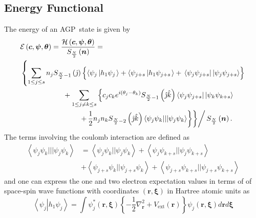 \documentclass[aps,preprint]{revtex4}%
\begin{document}
\subsection{Energy Functional\label{AGPFunc}}

The energy of an AGP\ state is given by
\begin{align}
&  \mathcal{E}\left(  \boldsymbol{c},\boldsymbol{\psi},\boldsymbol{\theta
}\right)  =\frac{\mathcal{H}\left(  \boldsymbol{c},\boldsymbol{\psi
},\boldsymbol{\theta}\right)  }{S_{\frac{N}{2}}\left(  \boldsymbol{n}\right)
}=\nonumber\\
&  \left\{  \sum_{1\leq j\leq s}n_{j}S_{\frac{N}{2}-1}\left(  \hat{\jmath
}\right)  \left\{  \overset{}{\left\langle \psi_{j}\left\vert h_{1}\psi
_{j}\right.  \right\rangle +\left\langle \psi_{j+s}\left\vert h_{1}\psi
_{j+s}\right.  \right\rangle }+\,\left\langle \psi_{j}\psi_{j+s}\right\vert
\left\vert \psi_{j}\psi_{j+s}\right\rangle \right\}  \right. \nonumber\\
&  \qquad\qquad\qquad+\sum_{1\leq j\neq k\leq s}\left\{  c_{j}c_{k}e^{i\left(
\theta_{j}-\theta_{k}\right)  }S_{\frac{N}{2}-1}\left(  \hat{\jmath}\hat
{k}\right)  \left\langle \psi_{j}\psi_{j+s}\right\vert \left\vert \psi_{k}%
\psi_{k+s}\right\rangle \right. \nonumber\\
&  \qquad\qquad\qquad\qquad\left.  \left.  \left.  +\,\frac{1}{2}\overset
{}{n_{j}n_{k}S_{\frac{N}{2}-2}\left(  \hat{\jmath}\hat{k}\right)  \left\langle
\psi_{j}\psi_{k}|||\psi_{j}\psi_{k}\right\rangle }\right\}  \right\}  \right/
S_{\frac{N}{2}}\left(  \boldsymbol{n}\right)  . \label{EnFunc}%
\end{align}
The terms involving the coulomb interaction are defined as
\begin{align}
\left\langle \psi_{j}\psi_{k}|||\psi_{j}\psi_{k}\right\rangle  &
=\left\langle \psi_{j}\psi_{k}||\psi_{j}\psi_{k}\right\rangle +\left\langle
\psi_{j}\psi_{k+s}||\psi_{j}\psi_{k+s}\right\rangle \nonumber\\
&  +\left\langle \psi_{j+s}\psi_{k}||\psi_{j+s}\psi_{k}\right\rangle
+\left\langle \psi_{j+s}\psi_{k+s}||\psi_{j+s}\psi_{k+s}\right\rangle
\end{align}
and one can express the one and two electron expectation values in terms of of
space-spin wave functions with coordinates $\left(  \boldsymbol{r}%
,\boldsymbol{\xi}\right)  $ in Hartree atomic units as
\begin{equation}
\left\langle \psi_{j}\left\vert h_{1}\psi_{j}\right.  \right\rangle =\int
\psi_{j}^{\ast}\left(  \boldsymbol{r},\boldsymbol{\xi}\right)  \left\{
-\frac{1}{2}\nabla_{\boldsymbol{r}}^{2}+V_{\text{ext}}\left(  \boldsymbol{r}%
\right)  \right\}  \psi_{j}\left(  \boldsymbol{r},\boldsymbol{\xi}\right)
d\boldsymbol{r}d\boldsymbol{\xi} \label{H1}%
\end{equation}
\end{document}
